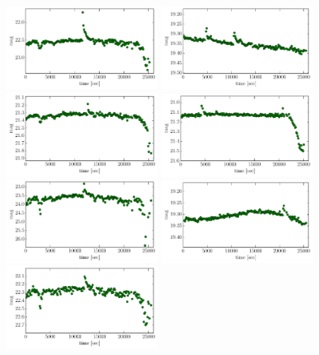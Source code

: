 \documentclass[iop, apj]{emulateapj}
\newcommand{\?}{\stackrel{?}{=}}
\begin{document}
\begin{figure}[h]
\includegraphics[width=5cm,clip,angle=90]{pic/flare/cand_14.pdf}
\includegraphics[width=5cm,clip,angle=90]{pic/flare/cand_15.pdf}
\includegraphics[width=5cm,clip,angle=90]{pic/flare/cand_16.pdf}
\includegraphics[width=5cm,clip,angle=90]{pic/flare/cand_17.pdf}
\includegraphics[width=5cm,clip,angle=90]{pic/flare/cand_18.pdf}
\includegraphics[width=5cm,clip,angle=90]{pic/flare/cand_19.pdf}
\includegraphics[width=5cm,clip,angle=90]{pic/flare/cand_20.pdf}

\end{figure}
\end{document}

